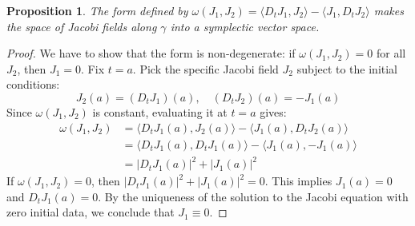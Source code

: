 \documentclass[11pt, a4paper]{article}
\theoremstyle{plain}
\newtheorem{proposition}[theorem]{Proposition}
\theoremstyle{definition}
\theoremstyle{remark}
\begin{document}
{\begin{proposition}
The form defined by $\omega(J_1, J_2) = \langle D_t J_1, J_2 \rangle - \langle J_1, D_t J_2 \rangle$ makes the space of Jacobi fields along $\gamma$ into a symplectic vector space.
\end{proposition}
\begin{proof}
We have to show that the form is non-degenerate: if $\omega(J_1, J_2) = 0$ for all $J_2$, then $J_1 = 0$.
Fix $t=a$. Pick the specific Jacobi field $J_2$ subject to the initial conditions:
\[ J_2(a) = (D_t J_1)(a), \quad (D_t J_2)(a) = -J_1(a) \]
Since $\omega(J_1, J_2)$ is constant, evaluating it at $t=a$ gives:
\begin{align*}
    \omega(J_1, J_2) &= \langle D_t J_1(a), J_2(a) \rangle - \langle J_1(a), D_t J_2(a) \rangle \\
    &= \langle D_t J_1(a), D_t J_1(a) \rangle - \langle J_1(a), -J_1(a) \rangle \\
    &= |D_t J_1(a)|^2 + |J_1(a)|^2
\end{align*}
If $\omega(J_1, J_2) = 0$, then $|D_t J_1(a)|^2 + |J_1(a)|^2 = 0$. 
This implies $J_1(a) = 0$ and $D_t J_1(a) = 0$. By the uniqueness of the solution to the Jacobi equation with zero initial data, we conclude that $J_1 \equiv 0$.
\end{proof}

}
\newpage
\end{document}
